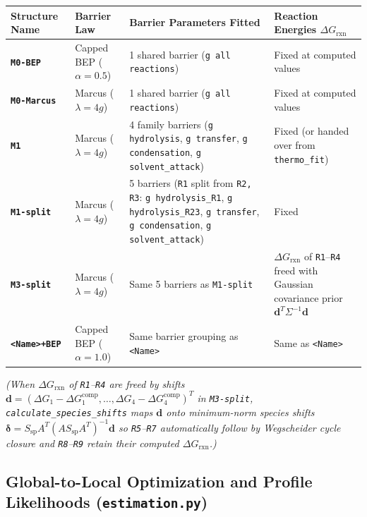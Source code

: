 \documentclass[11pt,a4paper]{article}
\begin{document}
\begin{tabularx}{\textwidth}{L{2.5cm} L{3.3cm} Y L{4.5cm}}
\toprule
\textbf{Structure Name} & \textbf{Barrier Law} & \textbf{Barrier Parameters Fitted} & \textbf{Reaction Energies $\Delta G_{\text{rxn}}$} \\
\midrule
\textbf{\texttt{M0-BEP}} & Capped BEP ($\alpha = 0.5$) & 1 shared barrier (\texttt{g all reactions}) & Fixed at computed values \\[3pt]
\textbf{\texttt{M0-Marcus}} & Marcus ($\lambda = 4g$) & 1 shared barrier (\texttt{g all reactions}) & Fixed at computed values \\[3pt]
\textbf{\texttt{M1}} & Marcus ($\lambda = 4g$) & 4 family barriers (\texttt{g hydrolysis}, \texttt{g transfer}, \texttt{g condensation}, \texttt{g solvent\_\allowbreak{}attack}) & Fixed (or handed over from \texttt{thermo\_\allowbreak{}fit}) \\[3pt]
\textbf{\texttt{M1-split}} & Marcus ($\lambda = 4g$) & 5 barriers (\texttt{R1} split from \texttt{R2,\allowbreak{} R3}: \texttt{g hydrolysis\_\allowbreak{}R1}, \texttt{g hydrolysis\_\allowbreak{}R23}, \texttt{g transfer}, \texttt{g condensation}, \texttt{g solvent\_\allowbreak{}attack}) & Fixed \\[3pt]
\textbf{\texttt{M3-split}} & Marcus ($\lambda = 4g$) & Same 5 barriers as \texttt{M1-split} & $\Delta G_{\text{rxn}}$ of \texttt{R1}--\texttt{R4} freed with Gaussian covariance prior $\mathbf{d}^T \Sigma^{-1} \mathbf{d}$ \\[3pt]
\textbf{\texttt{<Name>+BEP}} & Capped BEP ($\alpha = 1.0$) & Same barrier grouping as \texttt{<Name>} & Same as \texttt{<Name>} \\
\bottomrule
\end{tabularx}

\medskip
\emph{(When $\Delta G_{\text{rxn}}$ of \texttt{R1}--\texttt{R4} are freed by shifts $\mathbf{d} = (\Delta G_1 - \Delta G_1^{\text{comp}}, \dots, \Delta G_4 - \Delta G_4^{\text{comp}})^T$ in \texttt{M3-split}, \texttt{calculate\_\allowbreak{}species\_\allowbreak{}shifts} maps $\mathbf{d}$ onto minimum-norm species shifts $\bm{\delta} = S_{\text{sp}} A^T (A S_{\text{sp}} A^T)^{-1} \mathbf{d}$ so \texttt{R5}--\texttt{R7} automatically follow by Wegscheider cycle closure and \texttt{R8}--\texttt{R9} retain their computed $\Delta G_{\text{rxn}}$.)}

\subsection{Global-to-Local Optimization and Profile Likelihoods (\texttt{estimation.py})}
\end{document}
